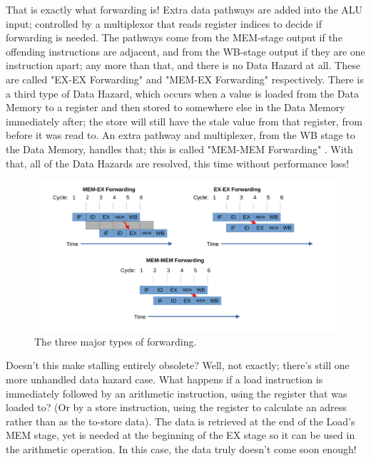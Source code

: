 \documentclass[12pt,twoside]{reedthesis}
\begin{document}
That is exactly what forwarding is! Extra data pathways are added  into the ALU input; controlled by a multiplexor that reads register indices to decide if forwarding is needed. The pathways come from the MEM-stage output if the offending instructions are adjacent, and from the WB-stage output if they are one instruction apart; any more than that, and there is no Data Hazard at all. These are called "EX-EX Forwarding" and "MEM-EX Forwarding" respectively. There is a third type of Data Hazard, which occurs when a value is loaded from the Data Memory to a register and then stored to somewhere else in the Data Memory immediately after; the store will still have the stale value from that register, from before it was read to. An extra pathway and multiplexer, from the WB stage to the Data Memory, handles that; this is called "MEM-MEM Forwarding" . With that, all of the Data Hazards are resolved, this time without performance loss!

\begin{figure}[h!]

	\centering
	\includegraphics[scale=0.46]{forwards}
	\caption{The three major types of forwarding.}
	\label{fwd-types}
\end{figure}

Doesn't this make stalling entirely obsolete? Well, not exactly; there's still one more unhandled data hazard case. What happens if a load instruction is immediately followed by an arithmetic instruction, using the register that was loaded to? (Or by a store instruction, using the register to calculate an adress rather than as the to-store data). The data is retrieved at the end of the Load's MEM stage, yet is needed at the beginning of the EX stage so it can be used in the arithmetic operation. In this case, the data truly doesn't come soon enough!
\end{document}
